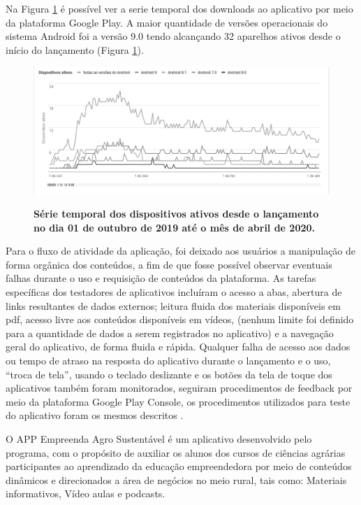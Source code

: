 Na Figura \ref{figura_43} é possível ver a serie temporal dos downloads ao aplicativo por meio da plataforma Google Play. A maior quantidade de versões operacionais do sistema Android foi a versão 9.0 tendo alcançando 32 aparelhos ativos desde o início do lançamento (Figura \ref{figura_43}).

\begin{figure}[H]
\caption{\textbf{Série temporal dos dispositivos ativos desde o lançamento no dia 01 de outubro de 2019 até o mês de abril de 2020.}}
\centering
\includegraphics[scale=0.6]{Imagens/dispositivos_instalados.png}
\label{figura_43}
\end{figure}

Para o fluxo de atividade da aplicação, foi deixado aos usuários a manipulação de forma orgânica dos conteúdos, a fim de que fosse possível observar eventuais falhas durante o uso e requisição de conteúdos da plataforma. 
As tarefas específicas dos testadores de aplicativos incluíram o acesso a abas, abertura de links resultantes de dados externos; leitura fluida dos materiais disponíveis em pdf, acesso livre aos conteúdos disponíveis em vídeos, (nenhum limite foi definido para a quantidade de dados a serem registrados no aplicativo) e a navegação geral do aplicativo, de forma fluida e rápida.
 Qualquer falha de acesso aos dados ou tempo de atraso na resposta do aplicativo durante o lançamento e o uso, “troca de tela”, usando o teclado deslizante e os botões da tela de toque dos aplicativos também foram monitorados, seguiram procedimentos de feedback por meio da plataforma Google Play Console, os procedimentos utilizados para teste do aplicativo foram os mesmos descritos .

O APP Empreenda Agro Sustentável é um aplicativo desenvolvido pelo programa, com o propósito de auxiliar os alunos dos cursos de ciências agrárias participantes ao aprendizado da educação empreendedora por meio de conteúdos dinâmicos e direcionados a área de negócios no meio rural, tais como: Materiais informativos, Vídeo aulas e podcasts.

